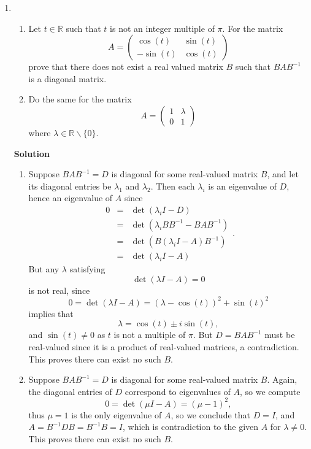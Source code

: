 \documentclass{article}
\newcommand{\matrixiibyii}[4]{\left( \begin{array}{cc} #1 & #2 \\ #3 & #4 \end{array} \right)}
\begin{document}
\begin{enumerate}
\item

\begin{enumerate}
\item Let \(t \in \mathbb{R}\) such that \(t\) is not an integer multiple of \(\pi\).  For the matrix
\[A = \matrixiibyii{\cos(t)}{\sin(t)}{-\sin(t)}{\cos(t)}\]
prove that there does not exist a real valued matrix \(B\) such that \(BAB^{-1}\) is a diagonal matrix.

\item Do the same for the matrix
\[A = \matrixiibyii{1}{\lambda}{0}{1}\]
where \(\lambda \in \mathbb{R} \backslash \{0\}\).

\end{enumerate}

{\bf Solution}

\begin{enumerate}
\item Suppose \(BAB^{-1} = D\) is diagonal for some real-valued matrix \(B\), and let its diagonal entries be \(\lambda_1\) and \(\lambda_2\).  Then each \(\lambda_i\) is an eigenvalue of \(D\), hence an eigenvalue of \(A\) since
\[\begin{array}{rcl}
  0 & = & \det(\lambda_i I - D) \\
    & = & \det(\lambda_i BB^{-1} - BAB^{-1}) \\
    & = & \det(B(\lambda_i I - A)B^{-1}) \\
    & = & \det(\lambda_i I - A)
  \end{array}.\]
But any \(\lambda\) satisfying
\[\det(\lambda I - A) = 0\]
is not real, since
\[0 = \det(\lambda I - A)
    = (\lambda - \cos(t))^2 + \sin(t)^2\]
implies that
\[\lambda = \cos(t) \pm i \sin(t),\]
and \(\sin(t) \neq 0\) as \(t\) is not a multiple of \(\pi\).  But \(D = BAB^{-1}\) must be real-valued since it is a product of real-valued matrices, a contradiction.  This proves there can exist no such \(B\).

\item Suppose \(BAB^{-1} = D\) is diagonal for some real-valued matrix \(B\).  Again, the diagonal entries of \(D\) correspond to eigenvalues of \(A\), so we compute
\[0 = \det(\mu I - A)
    = (\mu - 1)^2,\]
thus \(\mu = 1\) is the only eigenvalue of \(A\), so we conclude that \(D = I\), and \(A = B^{-1}DB = B^{-1}B = I\), which is contradiction to the given \(A\) for \(\lambda \neq 0\).  This proves there can exist no such \(B\).

\end{enumerate}



\end{enumerate}
\end{document}
